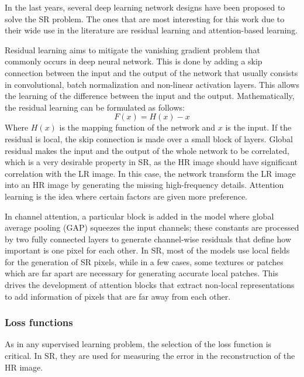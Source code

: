         In the last years, several deep learning network designs have been proposed to solve the SR problem.  The ones that are most interesting for this work due to their wide use in the literature are residual learning and attention-based learning. 
        
        Residual learning aims to mitigate the vanishing gradient problem that commonly occurs in deep neural network. This is done by adding a skip connection between the input and the output of the network that usually consists in convolutional, batch normalization and non-linear activation layers. This allows the learning of the difference between the input and the output. Mathematically, the residual learning can be formulated as follows:
        \begin{equation}
            F(x) = H(x) - x
            \label{eq:2-residual-learning}
        \end{equation}
        Where $H(x)$ is the mapping function of the network and $x$ is the input. If the residual is local, the skip connection is made over a small block of layers. Global residual makes the input and the output of the whole network to be correlated, which is a very desirable property in SR, as the HR image should have significant correlation with the LR image. In this case, the network transform the LR image into an HR image by generating the missing high-frequency details. 
        Attention learning is the idea where certain factors are given more preference. 

        In channel attention, a particular block is added in the model where global average pooling (GAP) squeezes the input channels; these constants are processed by two fully connected layers to generate channel-wise residuals that define how important is one pixel for each other.
        In SR, most of the models use local fields for the generation of SR pixels, while in a few cases, some textures or patches which are far apart are necessary for generating accurate local patches. This drives the development of attention blocks that extract non-local representations to add information of pixels that are far away from each other.


        \subsubsection{Loss functions}

        As in any supervised learning problem, the selection of the loss function is critical. In SR, they are used for measuring the error in the reconstruction of the HR image. 
        
